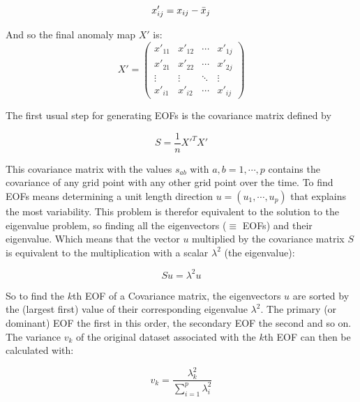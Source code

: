 \begin{equation}
  x'_{ij} = x_{ij} - \bar{x}_j \\
  \label{eq:anomaly map elements}
\end{equation}

And so the final anomaly map $X'$ is: 
\begin{equation}
  X' = \begin{pmatrix}
x'_{11} & x'_{12} & \cdots & x'_{1j} \\
x'_{21} & x'_{22} & \cdots & x'_{2j} \\
\vdots & \vdots & \ddots & \vdots \\
x'_{i1} & x'_{i2} & \cdots & x'_{ij}
\end{pmatrix}
  \label{eq:anomaly map}
\end{equation}

The first usual step for generating EOFs is the covariance matrix defined by 

\begin{equation}
  S = \frac{1}{n} X'^T X' 
  \label{eq:covariance map}
\end{equation}

This covariance matrix with the values $s_{ab}$ with $a,b = 1, \cdots, p$ contains the covariance of any grid point with any other grid point over the time. 
To find EOFs means determining a unit length direction $u = (u_1, \cdots, u_p)$ that explains the most variability. 
This problem is therefor equivalent to the solution to the eigenvalue problem, so finding all the eigenvectors ($\equiv$ EOFs) and their eigenvalue. Which means that the vector $u$ multiplied by the covariance matrix $S$ is equivalent to the multiplication with a scalar $\lambda^2$ (the eigenvalue):  

\begin{equation}
  Su = \lambda^2 u
  \label{eq:eigenvalue problem} 
\end{equation}

So to find the $k$th EOF of a Covariance matrix, the eigenvectors $u$ are sorted by the (largest first) value of their corresponding eigenvalue $\lambda^2$. 
The primary (or dominant) EOF the first in this order, the secondary EOF the second and so on. 
The variance $v_k$ of the original dataset associated with the $k$th EOF can then be calculated with: 

\begin{equation}
  v_k = \frac{\lambda^2_k}{\sum^{p}_{i=1} \lambda^2_i}
  \label{eq:eof variance calculation}
\end{equation}

